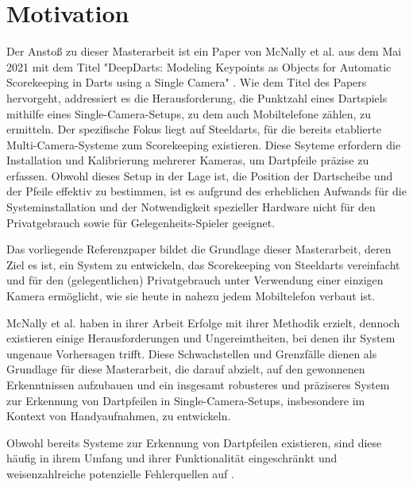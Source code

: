 \section{Motivation}
\label{sec:motivation}

Der Anstoß zu dieser Masterarbeit ist ein Paper von McNally et al. aus dem Mai 2021 mit dem Titel "DeepDarts: Modeling Keypoints as Objects for Automatic Scorekeeping in Darts using a Single Camera" \cite{deepdarts}. Wie dem Titel des Papers hervorgeht, addressiert es die Herausforderung, die Punktzahl eines Dartspiels mithilfe eines Single-Camera-Setups, zu dem auch Mobiltelefone zählen, zu ermitteln. Der spezifische Fokus liegt auf Steeldarts, für die bereits etablierte Multi-Camera-Systeme zum Scorekeeping existieren. Diese Ssyteme erfordern die Installation und Kalibrierung mehrerer Kameras, um Dartpfeile präzise zu erfassen. Obwohl dieses Setup in der Lage ist, die Position der Dartscheibe und der Pfeile effektiv zu bestimmen, ist es aufgrund des erheblichen Aufwands für die Systeminstallation und der Notwendigkeit spezieller Hardware nicht für den Privatgebrauch sowie für Gelegenheits-Spieler geeignet.

Das vorliegende Referenzpaper bildet die Grundlage dieser Masterarbeit, deren Ziel es ist, ein System zu entwickeln, das Scorekeeping von Steeldarts vereinfacht und für den (gelegentlichen) Privatgebrauch unter Verwendung einer einzigen Kamera ermöglicht, wie sie heute in nahezu jedem Mobiltelefon verbaut ist.

McNally et al. haben in ihrer Arbeit Erfolge mit ihrer Methodik erzielt, dennoch existieren einige Herausforderungen und Ungereimtheiten, bei denen ihr System ungenaue Vorhersagen trifft. Diese Schwachstellen und Grenzfälle dienen als Grundlage für diese Masterarbeit, die darauf abzielt, auf den gewonnenen Erkenntnissen aufzubauen und ein insgesamt robusteres und präziseres System zur Erkennung von Dartpfeilen in Single-Camera-Setups, insbesondere im Kontext von Handyaufnahmen, zu entwickeln.

Obwohl bereits Systeme zur Erkennung von Dartpfeilen existieren, sind diese häufig in ihrem Umfang und ihrer Funktionalität eingeschränkt und weisenzahlreiche potenzielle Fehlerquellen auf \cite{dartscore-repo}.

\iffalse

